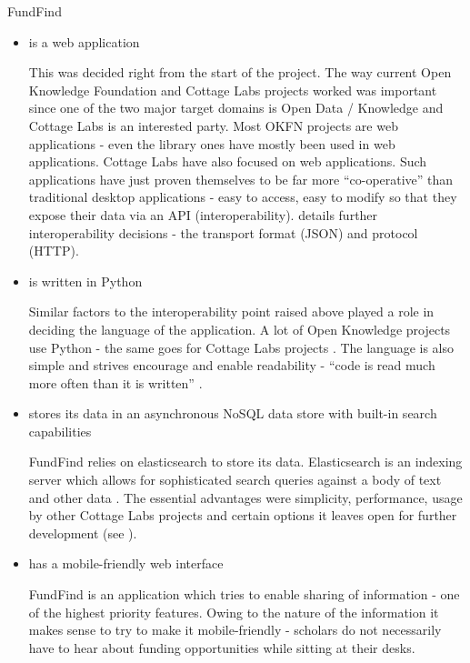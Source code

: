 FundFind
\begin{itemize}
 \item is a web application
 
This was decided right from the start of the project. The way current Open Knowledge Foundation and Cottage Labs projects worked was important since one of the two major target domains is Open Data / Knowledge and Cottage Labs is an interested party. Most OKFN projects are web applications - even the library ones have mostly been used in web applications. Cottage Labs have also focused on web applications. Such applications have just proven themselves to be far more ``co-operative'' than traditional desktop applications - easy to access, easy to modify so that they expose their data via an API (interoperability).  details further interoperability decisions - the transport format (JSON) and protocol (HTTP).
 
 \item is written in Python

Similar factors to the interoperability point raised above played a role in deciding the language of the application. A lot of Open Knowledge projects use Python \cite{nomenklatura, offenesparlament, pybossa, activityapi} - the same goes for Cottage Labs projects \cite{leaps, portality, oag, artemis, cl-web-code, xcri, negotiator}. The language is also simple and strives encourage and enable readability - ``code is read much more often than it is written'' \cite{pep8}.
 
 \item stores its data in an asynchronous NoSQL data store with built-in search capabilities
 
 FundFind relies on elasticsearch to store its data. Elasticsearch is an indexing server which allows for sophisticated search queries against a body of text and other data \cite{es}. The essential advantages were simplicity, performance, usage by other Cottage Labs projects and certain options it leaves open for further development (see ).
 
 \item has a mobile-friendly web interface
 
 FundFind is an application which tries to enable sharing of information - one of the highest priority features. Owing to the nature of the information it makes sense to try to make it mobile-friendly - scholars do not necessarily have to hear about funding opportunities while sitting at their desks.
 

\end{itemize}
